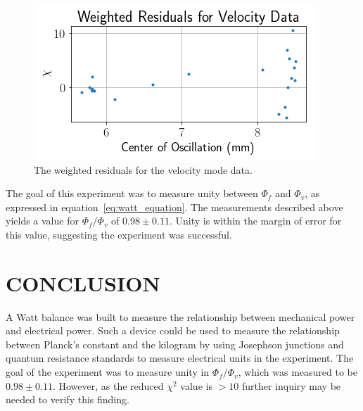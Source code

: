 \documentclass[aps,prstab,reprint,12pt]{revtex4-1}
\begin{document}
\begin{figure}[b]
    \centering
    \includegraphics[width=\linewidth]{figs/data/velocity_residuals.png}
    \caption{The weighted residuals for the velocity mode data.}
    \label{fig:velocity-residuals}
\end{figure}


The goal of this experiment was to measure unity between $\Phi_f$ and $\Phi_v$, as expressed in equation~\ref{eq:watt_equation}. The measurements described above yields a value for $\Phi_f/\Phi_v$ of $0.98 \pm 0.11$. Unity is within the margin of error for this value, suggesting the experiment was successful. 


\section{CONCLUSION}

A Watt balance was built to measure the relationship between mechanical power and electrical power. Such a device could be used to measure the relationship between Planck's constant and the kilogram by using Josephson junctions and quantum resistance standards to measure electrical units in the experiment. The goal of the experiment was to measure unity in $\Phi_f/\Phi_v$, which was measured to be $0.98 \pm 0.11$. However, as the reduced $\chi^2$ value is $>10$ further inquiry may be needed to verify this finding.


 

\end{document}

